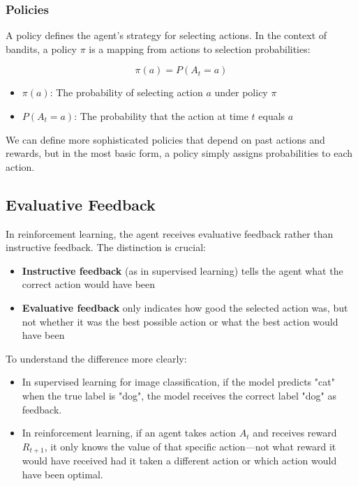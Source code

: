 \documentclass{article}
\begin{document}
\subsubsection{Policies}
A policy defines the agent's strategy for selecting actions. In the context of bandits, a policy $\pi$ is a mapping from actions to selection probabilities:

\begin{equation}
    \pi(a) = P(A_t = a)
\end{equation}

\begin{tcolorbox}[colback=blue!5!white,colframe=blue!75!black,title=Notation Overview]
\begin{itemize}
    \item $\pi(a)$: The probability of selecting action $a$ under policy $\pi$
    \item $P(A_t = a)$: The probability that the action at time $t$ equals $a$
\end{itemize}
\end{tcolorbox}

We can define more sophisticated policies that depend on past actions and rewards, but in the most basic form, a policy simply assigns probabilities to each action.

\subsection{Evaluative Feedback}
In reinforcement learning, the agent receives evaluative feedback rather than instructive feedback. The distinction is crucial:

\begin{itemize}
    \item \textbf{Instructive feedback} (as in supervised learning) tells the agent what the correct action would have been
    \item \textbf{Evaluative feedback} only indicates how good the selected action was, but not whether it was the best possible action or what the best action would have been
\end{itemize}

To understand the difference more clearly:
\begin{itemize}
    \item In supervised learning for image classification, if the model predicts "cat" when the true label is "dog", the model receives the correct label "dog" as feedback.
    \item In reinforcement learning, if an agent takes action $A_t$ and receives reward $R_{t+1}$, it only knows the value of that specific action—not what reward it would have received had it taken a different action or which action would have been optimal.
\end{itemize}
\end{document}
